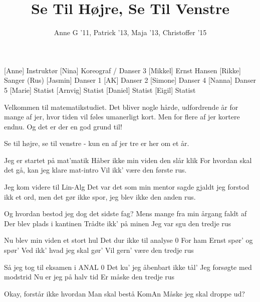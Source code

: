 \documentclass[a4paper,11pt]{article}
\title{Se Til Højre, Se Til Venstre}
\author{Anne G '11, Patrick '13, Maja '13, Christoffer '15}
\begin{document}
\maketitle

\begin{roles}
[Anne] Instruktør
[Nina] Koreograf / Danser 3
[Mikkel] Ernst Hansen
[Rikke] Sanger (Rus)
[Jasmin] Danser 1
[AK] Danser 2
[Simone] Danser 4
[Nanna] Danser 5
[Marie] Statist
[Arnvig] Statist
[Daniel] Statist
[Eigil] Statist
\end{roles}

\begin{sketch}


 Velkommen til matematikstudiet. Det bliver nogle hårde, udfordrende år for mange af jer, hvor tiden vil føles umanerligt kort. Men for flere af jer kortere endnu. Og det er der en god grund til!

 Se til højre, se til venstre - kun en af jer tre er her om et år.

\end{sketch}

\begin{song}
 Jeg er startet på mat'matik
Håber ikke min viden den slår klik
For hvordan skal det gå, kan jeg klare mat-intro
Vil ikk' være den første rus.

Jeg kom videre til Lin-Alg
Det var det som min mentor sagde gjaldt
jeg forstod ikk et ord,
men det gør ikke spor,
jeg blev ikke den anden rus.

Og hvordan bestod jeg dog det sidste fag?
Mens mange fra min årgang faldt af
Der blev plads i kantinen
Trådte ikk' på minen
Jeg var sgu den tredje rus

Nu blev min viden et stort hul
Det dur ikke til analyse 0
For ham Ernst spør' og spør'
Ved ikk' hvad jeg skal gør'
Vil gern' være den tredje rus

Så jeg tog til eksamen i ANAL 0
Det ku' jeg åbenbart ikke tål'
Jeg forsøgte med modstrid
Nu er jeg på halv tid
Er måske den tredje rus

Okay, forstår ikke hvordan
Man skal bestå KomAn
Måske jeg skal droppe ud?
\end{song}
\end{document}
